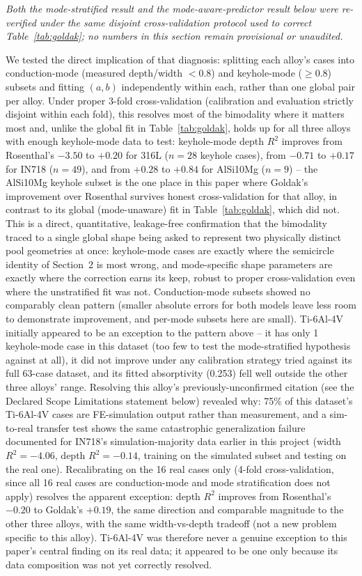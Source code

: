 \documentclass[12pt]{article}
\begin{document}
\emph{Both the mode-stratified result and the mode-aware-predictor result below were re-verified under the same disjoint cross-validation protocol used to correct Table~\ref{tab:goldak}; no numbers in this section remain provisional or unaudited.}

We tested the direct implication of that diagnosis: splitting each alloy's cases into conduction-mode (measured depth/width $<0.8$) and keyhole-mode ($\geq 0.8$) subsets and fitting $(a,b)$ independently within each, rather than one global pair per alloy. Under proper 3-fold cross-validation (calibration and evaluation strictly disjoint within each fold), this resolves most of the bimodality where it matters most and, unlike the global fit in Table~\ref{tab:goldak}, holds up for all three alloys with enough keyhole-mode data to test: keyhole-mode depth $R^2$ improves from Rosenthal's $-3.50$ to $+0.20$ for 316L ($n=28$ keyhole cases), from $-0.71$ to $+0.17$ for IN718 ($n=49$), and from $+0.28$ to $+0.84$ for AlSi10Mg ($n=9$) -- the AlSi10Mg keyhole subset is the one place in this paper where Goldak's improvement over Rosenthal survives honest cross-validation for that alloy, in contrast to its global (mode-unaware) fit in Table~\ref{tab:goldak}, which did not. This is a direct, quantitative, leakage-free confirmation that the bimodality traced to a single global shape being asked to represent two physically distinct pool geometries at once: keyhole-mode cases are exactly where the semicircle identity of Section~2 is most wrong, and mode-specific shape parameters are exactly where the correction earns its keep, robust to proper cross-validation even where the unstratified fit was not. Conduction-mode subsets showed no comparably clean pattern (smaller absolute errors for both models leave less room to demonstrate improvement, and per-mode subsets here are small). Ti-6Al-4V initially appeared to be an exception to the pattern above -- it has only 1 keyhole-mode case in this dataset (too few to test the mode-stratified hypothesis against at all), it did not improve under any calibration strategy tried against its full 63-case dataset, and its fitted absorptivity (0.253) fell well outside the other three alloys' range. Resolving this alloy's previously-unconfirmed citation (see the Declared Scope Limitations statement below) revealed why: 75\% of this dataset's Ti-6Al-4V cases are FE-simulation output rather than measurement, and a sim-to-real transfer test shows the same catastrophic generalization failure documented for IN718's simulation-majority data earlier in this project (width $R^2=-4.06$, depth $R^2=-0.14$, training on the simulated subset and testing on the real one). Recalibrating on the 16 real cases only (4-fold cross-validation, since all 16 real cases are conduction-mode and mode stratification does not apply) resolves the apparent exception: depth $R^2$ improves from Rosenthal's $-0.20$ to Goldak's $+0.19$, the same direction and comparable magnitude to the other three alloys, with the same width-vs-depth tradeoff (not a new problem specific to this alloy). Ti-6Al-4V was therefore never a genuine exception to this paper's central finding on its real data; it appeared to be one only because its data composition was not yet correctly resolved.
\end{document}

